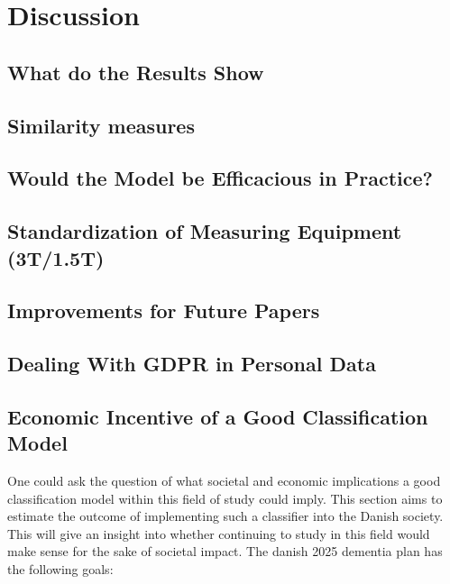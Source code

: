 \documentclass[12pt, fleqn, titlepage]{article}
\begin{document}
\section{Discussion}\label{discussion}

\subsection{What do the Results Show}\label{discussionOfResults}

\subsection{Similarity measures}

\subsection{Would the Model be Efficacious in Practice?}

\subsection{Standardization of Measuring Equipment (3T/1.5T)}

\subsection{Improvements for Future Papers}

\subsection{Dealing With GDPR in Personal Data}

\subsection{Economic Incentive of a Good Classification Model}

One could ask the question of what societal and economic implications a good classification model within this field of study could imply. This section aims to estimate the outcome of implementing such a classifier into the Danish society. This will give an insight into whether continuing to study in this field would make sense for the sake of societal impact. The danish 2025 dementia plan has the following goals:
\end{document}
